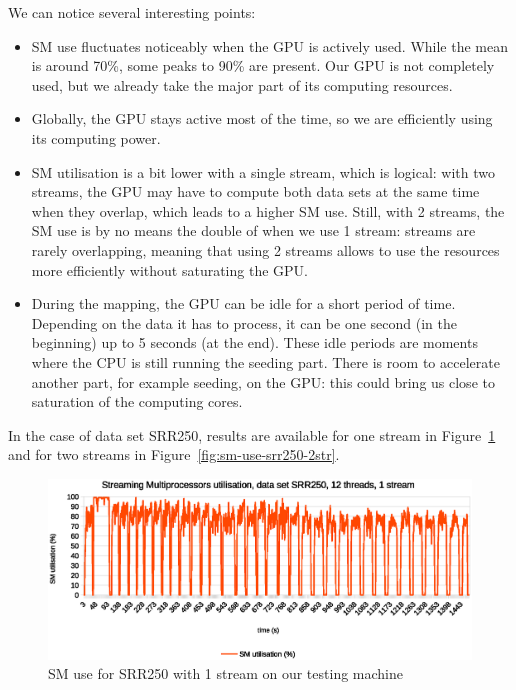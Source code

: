 We can notice several interesting points:
\begin{itemize}
    \item SM use fluctuates noticeably when the GPU is actively used. While the mean is around 70\%, some peaks to 90\% are present. Our GPU is not completely used, but we already take the major part of its computing resources.
    \item Globally, the GPU stays active most of the time, so we are efficiently using its computing power.
    \item SM utilisation is a bit lower with a single stream, which is logical: with two streams, the GPU may have to compute both data sets at the same time when they overlap, which leads to a higher SM use. Still, with 2 streams, the SM use is by no means the double of when we use 1 stream: streams are rarely overlapping, meaning that using 2 streams allows to use the resources more efficiently without saturating the GPU.
    \item During the mapping, the GPU can be idle for a short period of time. Depending on the data it has to process, it can be one second (in the beginning) up to 5 seconds (at the end). These idle periods are moments where the CPU is still running the seeding part. There is room to accelerate another part, for example seeding, on the GPU: this could bring us close to saturation of the computing cores.
\end{itemize}{}

In the case of data set SRR250, results are available for one stream in Figure~\ref{fig:sm-use-srr250-1str} and for two streams in Figure~\ref{fig:sm-use-srr250-2str}.

\begin{figure}[h]
	\centering
	\includegraphics[width=0.9\linewidth]{SM_utilisation_12threads1stream_SRR250}
	\caption{SM use for SRR250 with 1 stream on our testing machine}
	\label{fig:sm-use-srr250-1str}
\end{figure}

